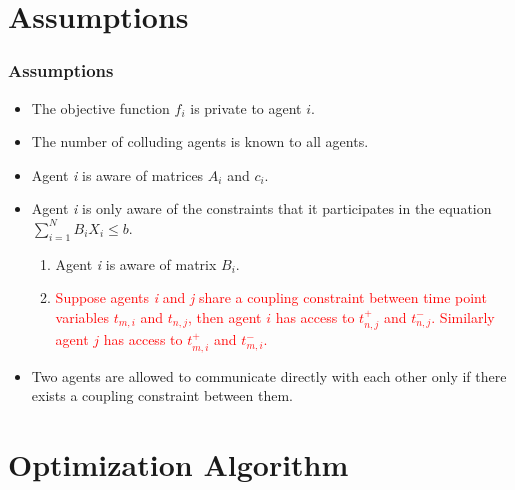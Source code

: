 \documentclass{beamer}
\begin{document}
\section{Assumptions}
\begin{frame}
\frametitle{Assumptions}
\begin{itemize}
\item The objective function $f_i$ is private to agent $i$.
\item The number of colluding agents is known to all agents.
\item Agent \textit{i} is aware of matrices $A_i$ and $c_i$.
\item Agent \textit{i} is only aware of the constraints that it participates in the equation $\sum_{i=1}^{N} B_i X_i \leq b$. 
\begin{enumerate}
\item Agent \textit{i} is aware of matrix $B_i$.
\item \textcolor{red}{Suppose agents \textit{i} and \textit{j} share a coupling constraint between time point variables $t_{m,i}$ and $t_{n,j}$, then agent $i$ has access to $t_{n,j}^{+}$ and $t_{n,j}^{-}$. Similarly  agent $j$ has access to $t_{m,i}^{+}$ and $t_{m,i}^{-}$.}
\end{enumerate}
\item Two agents are allowed to communicate directly with each other only if there exists a coupling constraint between them.
\end{itemize}
\end{frame}

\section{Optimization Algorithm}
\end{document}
